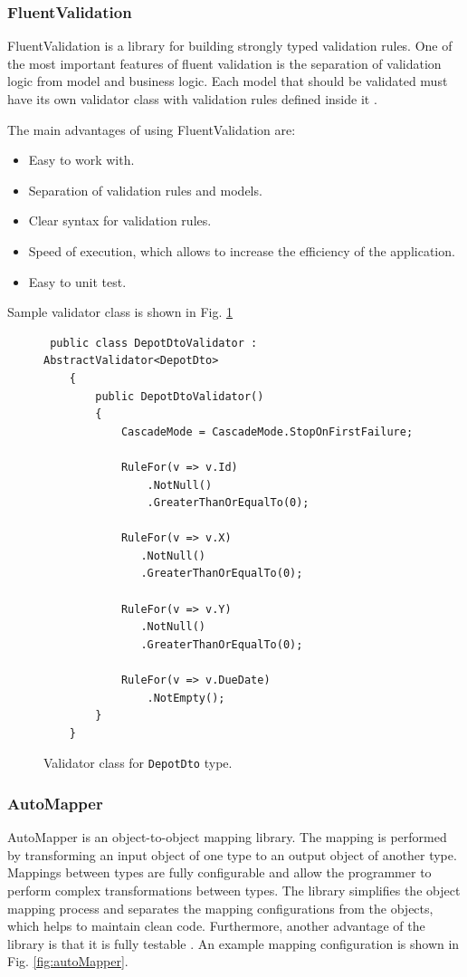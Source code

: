 \documentclass[a4paper,twoside,12pt]{book}
\begin{document}
\subsubsection{FluentValidation}
FluentValidation is a library for building strongly typed validation rules. One of the most important features of fluent validation is the separation of validation logic from model and business logic. Each model that should be validated must have its own validator class with validation rules defined inside it \cite{bib:fluentValidation}. 

The main advantages of using FluentValidation are:
\begin{itemize}
\item Easy to work with.
\item Separation of validation rules and models.
\item Clear syntax for validation rules.
\item Speed of execution, which allows to increase the efficiency of the application.
\item Easy to unit test.
\end{itemize}

Sample validator class is shown in Fig. \ref{fig:validator}

\begin{figure}
\centering
\begin{lstlisting}
 public class DepotDtoValidator : AbstractValidator<DepotDto>
    {
        public DepotDtoValidator()
        {
            CascadeMode = CascadeMode.StopOnFirstFailure;

            RuleFor(v => v.Id)
                .NotNull()
                .GreaterThanOrEqualTo(0);

            RuleFor(v => v.X)
               .NotNull()
               .GreaterThanOrEqualTo(0);

            RuleFor(v => v.Y)
               .NotNull()
               .GreaterThanOrEqualTo(0);

            RuleFor(v => v.DueDate)
                .NotEmpty();
        }
    }
\end{lstlisting}
\caption{Validator class for \lstinline|DepotDto| type.}
\label{fig:validator}
\end{figure}

\subsubsection{AutoMapper}
AutoMapper is an object-to-object mapping library. The mapping is performed by transforming an input object of one type to an output object of another type. Mappings between types are fully configurable and allow the programmer to perform complex transformations between types. 
The library simplifies the object mapping process and separates the mapping configurations from the objects, which helps to maintain clean code. Furthermore, another advantage of the library is that it is fully testable \cite{bib:AutoMapper}.
An example mapping configuration is shown in Fig. \ref{fig:autoMapper}.
\end{document}

